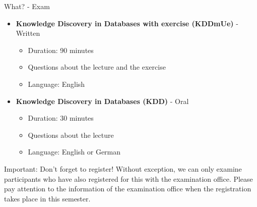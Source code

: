 \begin{frame}{What? - Exam}
	\begin{itemize}
		\item \textbf{Knowledge Discovery in Databases with exercise (KDDmUe)} - Written
		      \begin{itemize}
			      \item Duration: 90 minutes
			      \item Questions about the lecture and the exercise
			      \item {\color{gray} Language: English}
		      \end{itemize}
		\item \textbf{Knowledge Discovery in Databases (KDD)} - Oral
		      \begin{itemize}
			      \item Duration: 30 minutes
			      \item Questions about the lecture
			      \item {\color{gray} Language: English or German}
		      \end{itemize}
	\end{itemize}
	\begin{alertblock}{Important: Don't forget to register!}
		Without exception, we can only examine participants who have also registered for this with the examination office. Please pay attention to the information of the examination office when the registration takes place in this semester.
	\end{alertblock}
\end{frame}

